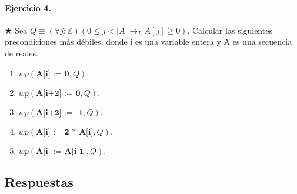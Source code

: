 \documentclass{article}
\begin{document}
\paragraph{Ejercicio 4.} $\bigstar$ Sea $Q \equiv (\forall j :\mathbb{Z})(0 \leq j < |A| \rightarrow_L
 A[j] \geq 0)$. Calcular las 
siguientes precondiciones más débiles, donde i es
una variable entera y A es una secuencia de reales.

\begin{enumerate}[label=\alph*)]
\item $wp(\textbf{A[i] := 0}, Q).$
\item $wp(\textbf{A[i+2] := 0}, Q).$
\item $wp(\textbf{A[i+2] := -1}, Q).$
\item $wp(\textbf{A[i] := 2 * A[i]}, Q).$
\item $wp(\textbf{A[i] := A[i-1]}, Q).$
\end{enumerate}

\subsection*{Respuestas}
\end{document}
